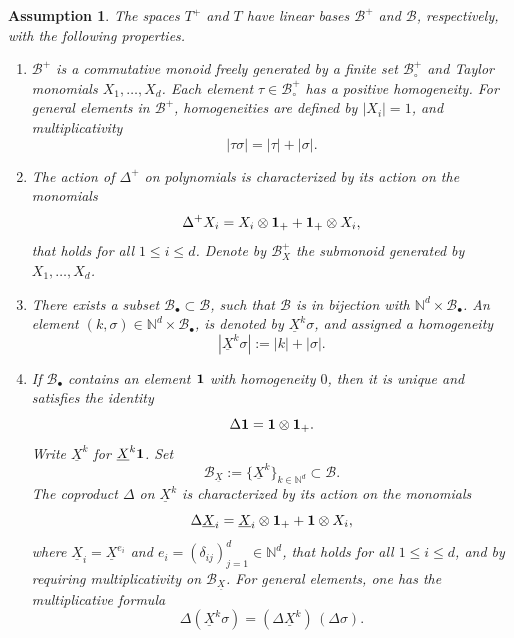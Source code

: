 \documentclass[JEP,XML,SOM,Unicode,published]{cedram}
\newcommand{\sbullet}{{\scriptscriptstyle\bullet}}
\theoremstyle{plain}
\newtheorem{assumption}{Assumption}
\theoremstyle{definition}
\newcommand{\bbN}{\mathbb{N}}
\newcommand{\mcB}{\mathcal{B}}
\begin{document}
\begin{assumption}\label{ass:A}
The spaces $T^+$ and $T$ have linear bases $\mcB^+$ and $\mcB$, respectively, with the following properties.
\begin{enumerate}
\item\label{ass:A1} $\mcB^+$ is a commutative monoid freely generated by a finite set $\mcB_\circ^+$ and Taylor monomials $X_1,\dots,X_d$.
Each element $\tau\in\mcB_\circ^+$ has a positive homogeneity. For general elements in $\mcB^+$, homogeneities are defined by $|X_i|=1$, and multiplicativity
\[
|\tau\sigma|=|\tau|+|\sigma|.
\]

\item\label{ass:A2} The action of $\Delta^+$ on polynomials is characterized by its action on the monomials
\begin{equation} \label{EqPreLeibniz}
\Delta^+X_i = X_i\otimes {\bf 1}_+ + {\bf 1}_+\otimes X_i,
\end{equation}
that holds for all $1\leq i\leq d$. Denote by $\mcB_X^+$ the submonoid generated by $X_1,\dots,X_d$.

\item\label{ass:A3} There exists a subset $\mcB_\sbullet\subset\mcB$, such that $\mcB$ is in bijection with $\bbN^d\times\mcB_\sbullet$. An element $(k,\sigma)\in\bbN^d\times\mcB_\sbullet$, is denoted by $\underline{X}^k\sigma$, and assigned a homogeneity
\[
|\underline{X}^k\sigma| := |k|+|\sigma|.
\]

\item\label{ass:A4} If $\mcB_\sbullet$ contains an element ${\bf 1}$ with homogeneity $0$, then it is unique and satisfies the identity
\[
\Delta{\bf 1} = {\bf 1}\otimes{\bf 1}_+.
\]
Write $\underline{X}^k$ for $\underline{X}^k{\bf1}$. Set
\[
\mcB_{\underline{X}} := \{\underline{X}^k\}_{k\in\bbN^d}\subset\mcB.
\]
The coproduct $\Delta$ on $\underline{X}^k$ is characterized by its action on the monomials
\[
\Delta \underline{X}_i = \underline{X}_i\otimes {\bf 1}_+ + {\bf 1}\otimes X_i,
\]
where $\underline{X}_i=\underline{X}^{e_i}$ and $e_i=(\delta_{ij})_{j=1}^d\in\bbN^d$, that holds for all $1\leq i\leq d$, and by requiring multiplicativity on $\mcB_{\underline{X}}$. For general elements, one has the multiplicative formula
\[
\Delta(\underline{X}^k\sigma) = (\Delta \underline{X}^k)\,(\Delta\sigma).
\]
\end{enumerate}
\end{assumption}
\end{document}
